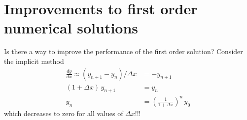 \documentclass[12pt]{article}
\begin{document}
\section{Improvements to first order numerical solutions}
Is there a way to improve the performance of the first order solution? Consider the implicit method
\begin{align}
\frac{dy}{dx} \approx (y_{n+1}-y_n)/\Delta x &= - y_{n+1}\\
(1+\Delta x)\, y_{n+1} &= y_n\\
y_n &= \left(\frac{1}{1+\Delta x}\right)^n\, y_0
\end{align}
which decreases to zero for all values of $\Delta x$!!!
\end{document}
